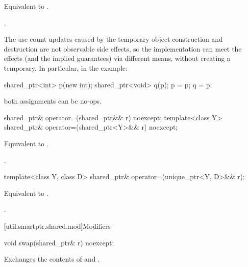 \begin{itemdescr}
\pnum
\effects
Equivalent to .

\pnum
\returns
{}.

\pnum
\begin{note}
The use count updates caused by the temporary object
construction and destruction are not observable side
effects, so the implementation can meet the effects (and the
implied guarantees) via different means, without creating a
temporary. In particular, in the example:
\begin{codeblock}
shared_ptr<int> p(new int);
shared_ptr<void> q(p);
p = p;
q = p;
\end{codeblock}
both assignments can be no-ops.
\end{note}
\end{itemdescr}

%
\begin{itemdecl}
shared_ptr& operator=(shared_ptr&& r) noexcept;
template<class Y> shared_ptr& operator=(shared_ptr<Y>&& r) noexcept;
\end{itemdecl}

\begin{itemdescr}
\pnum
\effects
Equivalent to .

\pnum
\returns
{}.
\end{itemdescr}

%
\begin{itemdecl}
template<class Y, class D> shared_ptr& operator=(unique_ptr<Y, D>&& r);
\end{itemdecl}

\begin{itemdescr}
\pnum
\effects
Equivalent to .

\pnum
\returns
{}.
\end{itemdescr}

[util.smartptr.shared.mod]{Modifiers}

%
\begin{itemdecl}
void swap(shared_ptr& r) noexcept;
\end{itemdecl}

\begin{itemdescr}

\pnum
\effects
Exchanges the contents of  and .
\end{itemdescr}

